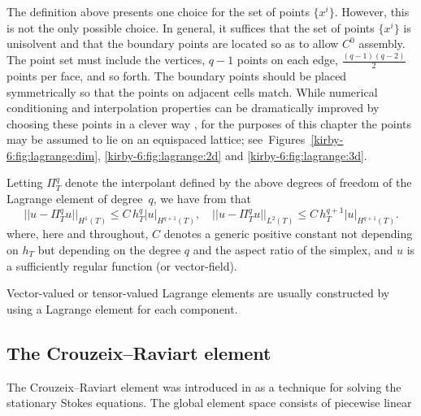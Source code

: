 The definition above presents one choice for the set of points
$\{x^i\}$. However, this is not the only possible choice. In general,
it suffices that the set of points $\{x^i\}$ is unisolvent and that
the boundary points are located so as to allow $C^0$ assembly. The
point set must include the vertices, $q-1$ points on each edge,
$\frac{(q-1)(q-2)}{2}$ points per face, and so forth. The boundary
points should be placed symmetrically so that the points on adjacent
cells match. While numerical conditioning and interpolation properties
can be dramatically improved by choosing these points in a clever way
\citep{Warburton2005}, for the purposes of this chapter the points
may be assumed to lie on an equispaced lattice;
see~Figures~\ref{kirby-6:fig:lagrange:dim},
\ref{kirby-6:fig:lagrange:2d} and \ref{kirby-6:fig:lagrange:3d}.

Letting $\Pi_T^q$ denote the interpolant defined by the above degrees
of freedom of the Lagrange element of degree~$q$, we have
from \citet{BrennerScott2008} that
\begin{equation}
  ||u - \Pi_T^q u||_{H^1(T)} \leqslant C \, h_T^{q} |u|_{H^{q+1}(T)}, \quad
  ||u - \Pi_T^q u||_{L^2(T)} \leqslant C \, h_T^{q+1} |u|_{H^{q+1}(T)}.
\end{equation}
where, here and throughout, $C$ denotes a generic positive constant
not depending on $h_T$ but depending on the degree $q$ and the aspect
ratio of the simplex, and $u$ is a sufficiently regular function (or
vector-field).

Vector-valued or tensor-valued Lagrange elements are usually constructed
by using a Lagrange element for each component.

\subsection{The Crouzeix--Raviart element}

{The Crouzeix--Raviart element was introduced in
\citet{CrouzeixRaviart1973} as a technique for solving the stationary
Stokes equations. The global element space consists of piecewise linear\hfilneg}




